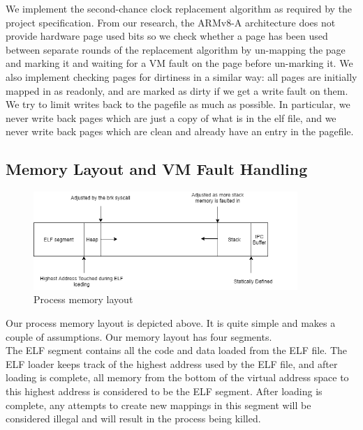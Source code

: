 \noindent
We implement the second-chance clock replacement algorithm
as required by the project specification. From our research,
the ARMv8-A architecture does not provide hardware page used
bits so we check whether a page has been used between separate
rounds of the replacement algorithm by un-mapping the page and
marking it and waiting for a VM fault on the page before
un-marking it. We also implement checking pages for dirtiness
in a similar way: all pages are initially mapped in as readonly,
and are marked as dirty if we get a write fault on them.
\\

\noindent
We try to limit writes back to the pagefile as much as possible.
In particular, we never write back pages which are just a copy of
what is in the elf file, and we never write back pages which are
clean and already have an entry in the pagefile.
\\


\subsection{Memory Layout and VM Fault Handling}

\begin{figure}[h]
    \centering
    \includegraphics[width=100mm]{memory_layout.png}
    \caption{Process memory layout}
    \label{fig:memory_layout}
\end{figure}

\noindent
Our process memory layout is depicted above. It is quite simple and
makes a couple of assumptions. Our memory layout has four segments.
\\

\noindent
The ELF segment contains all the code and data loaded from the ELF file.
The ELF loader keeps track of the highest address used by the ELF file, 
and after loading is complete, all memory from the bottom of the virtual
address space to this highest address is considered to be the ELF segment.
After loading is complete, any attempts to create new mappings in this
segment will be considered illegal and will result in the process being
killed.
\\

